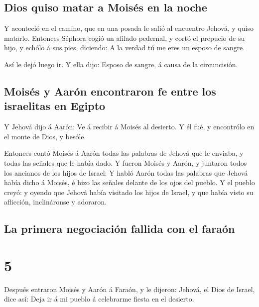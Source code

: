 \hypertarget{dios-quiso-matar-a-moisuxe9s-en-la-noche}{%
\subsection{Dios quiso matar a Moisés en la
noche}\label{dios-quiso-matar-a-moisuxe9s-en-la-noche}}

 Y aconteció en el camino, que en una posada le salió al
encuentro Jehová, y quiso matarlo.  Entonces Séphora cogió
un afilado pedernal, y cortó el prepucio de su hijo, y echólo á sus
pies, diciendo: A la verdad tú me eres un esposo de sangre.

 Así le dejó luego ir. Y ella dijo: Esposo de sangre, á
causa de la circuncisión.

\hypertarget{moisuxe9s-y-aaruxf3n-encontraron-fe-entre-los-israelitas-en-egipto}{%
\subsection{Moisés y Aarón encontraron fe entre los israelitas en
Egipto}\label{moisuxe9s-y-aaruxf3n-encontraron-fe-entre-los-israelitas-en-egipto}}

 Y Jehová dijo á Aarón: Ve á recibir á Moisés al desierto.
Y él fué, y encontrólo en el monte de Dios, y besóle.

 Entonces contó Moisés á Aarón todas las palabras de Jehová
que le enviaba, y todas las señales que le había dado.  Y
fueron Moisés y Aarón, y juntaron todos los ancianos de los hijos de
Israel:  Y habló Aarón todas las palabras que Jehová había
dicho á Moisés, é hizo las señales delante de los ojos del pueblo.
 Y el pueblo creyó: y oyendo que Jehová había visitado los
hijos de Israel, y que había visto su aflicción, inclináronse y
adoraron.

\hypertarget{la-primera-negociaciuxf3n-fallida-con-el-farauxf3n}{%
\subsection{La primera negociación fallida con el
faraón}\label{la-primera-negociaciuxf3n-fallida-con-el-farauxf3n}}

\hypertarget{section-4}{%
\section{5}\label{section-4}}

 Después entraron Moisés y Aarón á Faraón, y le dijeron:
Jehová, el Dios de Israel, dice así: Deja ir á mi pueblo á celebrarme
fiesta en el desierto.

